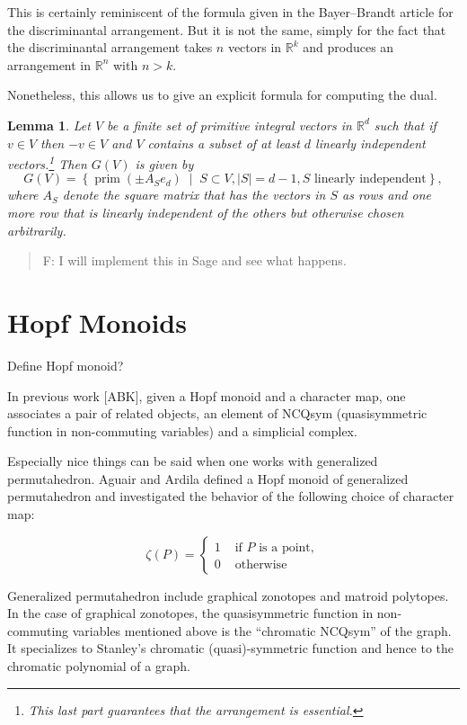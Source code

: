 \documentclass[11pt,letter]{amsart}
\newtheorem{lemma}[definition]{Lemma}
\newcommand{\RR}{\mathbb{R}}
\newcommand{\mset}[2]{ \left\{ #1 \; \middle| \; #2 \right\}}
\begin{document}
This is certainly reminiscent of the formula given in the Bayer--Brandt article for the discriminantal arrangement. But it is not the same, simply for the fact that the discriminantal arrangement takes $n$ vectors in $\RR^k$ and produces an arrangement in $\RR^n$ with $n>k$.

Nonetheless, this allows us to give an explicit formula for computing the dual.

\begin{lemma}
Let $V$ be a finite set of primitive integral vectors in $\RR^d$ such that if $v\in V$ then $-v\in V$ and $V$ contains a subset of at least $d$ linearly independent vectors.\footnote{This last part guarantees that the arrangement is essential.} Then $G(V)$ is given by
\[
  G(V) = \mset{\operatorname{prim}(\pm A_S e_d)}{ S\subset V, |S|=d-1, \text{$S$ linearly independent} },
\]
where $A_S$ denote the square matrix that has the vectors in $S$ as rows and one more row that is linearly independent of the others but otherwise chosen arbitrarily.
\end{lemma}

\begin{quote}
F: I will implement this in Sage and see what happens.
\end{quote}



\section{Hopf Monoids}

Define Hopf monoid?  

In previous work [ABK], given a Hopf monoid and a character map, one
associates a pair of related objects, an element of NCQsym
(quasisymmetric function in non-commuting variables) and a simplicial
complex.  

Especially nice things can be said when one works with generalized
permutahedron.  Aguair and Ardila defined a Hopf monoid of generalized
permutahedron and investigated the behavior of the following choice of
character map:

\begin{displaymath}
\zeta(P) = \left\{ \begin{array}{ll}
1 & \textrm{ if $P$ is a point}, \\
0 & \textrm{ otherwise}
\end{array} \right.
\end{displaymath}


Generalized permutahedron include graphical zonotopes and matroid
polytopes.  In the case of graphical zonotopes, the quasisymmetric
function in non-commuting variables mentioned above is the ``chromatic
NCQsym'' of the graph.  It specializes to Stanley's chromatic
(quasi)-symmetric function and hence to the chromatic polynomial of a
graph.
\end{document}
